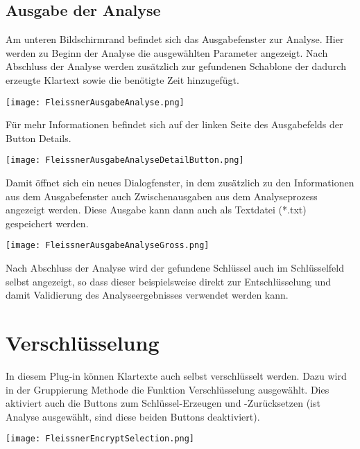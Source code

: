 \documentclass[fontsize=12pt, DIV=15, parskip=half-]{scrartcl}
\theoremstyle{break}
\begin{document}
\subsection{Ausgabe der Analyse}

Am unteren Bildschirmrand befindet sich das Ausgabefenster zur Analyse.
Hier werden zu Beginn der Analyse die ausgewählten Parameter angezeigt. Nach Abschluss der Analyse werden zusätzlich zur gefundenen Schablone der dadurch erzeugte Klartext sowie die benötigte Zeit hinzugefügt.

\texttt{[image: FleissnerAusgabeAnalyse.png]}

Für mehr Informationen befindet sich auf der linken Seite des Ausgabefelds der Button \glqq Details\grqq. 

\texttt{[image: FleissnerAusgabeAnalyseDetailButton.png]}

Damit öffnet sich ein neues Dialogfenster, in dem zusätzlich zu den Informationen aus dem Ausgabefenster auch Zwischenausgaben aus dem Analyseprozess angezeigt werden. Diese Ausgabe kann dann auch als Textdatei (*.txt) gespeichert werden.

\texttt{[image: FleissnerAusgabeAnalyseGross.png]}

Nach Abschluss der Analyse wird der gefundene Schlüssel auch im Schlüsselfeld selbst angezeigt, so dass dieser beispielsweise direkt zur Entschlüsselung und damit Validierung des Analyseergebnisses verwendet werden kann.
\newpage

\section{Verschlüsselung}\hypertarget{verschl}{}
In diesem Plug-in können Klartexte auch selbst verschlüsselt werden. Dazu wird in der Gruppierung
\glqq Methode\grqq{} die Funktion \glqq Verschlüsselung\grqq{} ausgewählt. Dies aktiviert auch die Buttons zum Schlüssel-Erzeugen und -Zurücksetzen (ist Analyse ausgewählt, sind diese beiden Buttons deaktiviert).
 

\texttt{[image: FleissnerEncryptSelection.png]}
\end{document}
